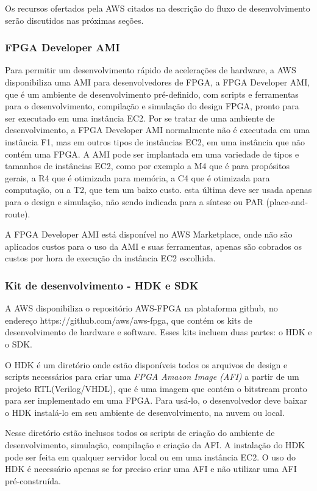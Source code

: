Os recursos ofertados pela AWS citados na descrição do fluxo de desenvolvimento serão discutidos nas próximas seções.

\subsubsection{ FPGA Developer AMI} \label{sec:ami}

Para permitir um desenvolvimento rápido de acelerações de hardware, a AWS disponibiliza uma AMI para desenvolvedores de FPGA, a FPGA Developer AMI, que é um ambiente de desenvolvimento pré-definido, com scripts e ferramentas para o desenvolvimento, compilação e simulação do design FPGA, pronto para ser executado em uma instância EC2. Por se tratar de uma ambiente de desenvolvimento, a FPGA Developer AMI normalmente não é executada em uma instância F1, mas em outros tipos de instâncias EC2, em uma instância que não contém uma FPGA. A AMI pode ser implantada em uma variedade de tipos e tamanhos de instâncias EC2, como por exemplo a M4 que é para propósitos gerais, a R4 que é otimizada para memória, a C4 que é otimizada para computação, ou a T2, que tem um baixo custo. esta última deve ser usada apenas para o design e simulação, não sendo indicada para a síntese ou PAR (place-and-route).

A FPGA Developer AMI está disponível no AWS Marketplace, onde não são aplicados custos para o uso da AMI e suas ferramentas, apenas são cobrados os custos por hora de execução da instância EC2 escolhida.


\subsubsection{Kit de desenvolvimento - HDK e SDK} \label{sec:hdk}
    
    A AWS disponibiliza o repositório AWS-FPGA na plataforma github, no endereço https://github.com/aws/aws-fpga, que contém os kits de desenvolvimento de hardware e software. Esses kits incluem duas partes: o HDK e o SDK.
    
    O HDK é um diretório onde estão disponíveis todos os arquivos de design e scripts necessários para criar uma \textit{FPGA Amazon Image (AFI)} a partir de um projeto RTL(Verilog/VHDL), que é uma imagem que contém o bitstream pronto para ser implementado em uma FPGA. Para usá-lo, o desenvolvedor deve baixar o HDK instalá-lo em seu ambiente de desenvolvimento, na nuvem ou local.
    
    Nesse diretório estão inclusos todos os scripts de criação do ambiente de desenvolvimento, simulação, compilação e criação da AFI. A instalação do HDK pode ser feita em qualquer servidor local ou em uma instância EC2. O uso do HDK é necessário apenas se for preciso criar uma AFI e não utilizar uma AFI pré-construída.
    

